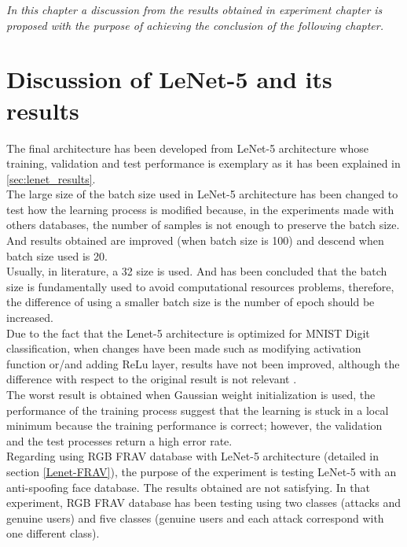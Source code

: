 \begin{small}
\emph{In this chapter a discussion from the results obtained in experiment chapter is proposed with the purpose of achieving the conclusion of the following chapter.}
\end{small}

\section{Discussion of LeNet-5 and its results}
The final architecture has been developed from LeNet-5 architecture whose training, validation and test performance is exemplary as it has been explained in \ref{sec:lenet_results}.\\

The large size of the batch size used in LeNet-5 architecture has been changed to test how the learning process is modified because, in the experiments made with others databases, the number of samples is not enough to preserve the batch size.  And results obtained are improved (when batch size is 100) and descend when batch size used is 20. \\

Usually, in literature, a 32 size is used. And has been concluded that the batch size is
 fundamentally used to avoid computational resources problems, therefore, the difference of using a smaller batch size is the number of epoch should be increased.\\

Due to the fact that the Lenet-5 architecture is optimized for MNIST Digit classification, when changes have been made such as modifying activation function or/and adding ReLu layer, results have not been improved, although the difference with respect to the original result is not relevant .\\

The worst result is obtained when Gaussian weight initialization is used, the performance of the training process suggest that the learning is stuck in a local minimum because the training performance is correct; however, the validation and the test processes return a high error rate.\\

Regarding using RGB FRAV database with LeNet-5 architecture (detailed in section \ref{Lenet-FRAV}), the purpose of the experiment is testing LeNet-5 with an anti-spoofing face database. The results obtained are not satisfying. In that experiment, RGB FRAV database has been testing using two classes (attacks and genuine users) and five classes (genuine users and each attack correspond with one different class).\\

